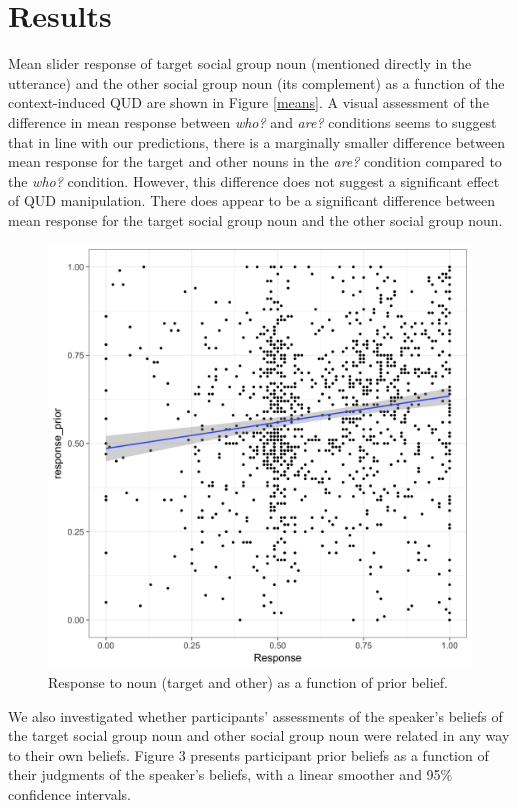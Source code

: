 \documentclass[11pt,a4paper]{article}
\begin{document}
\section{Results}

Mean slider response of target social group noun (mentioned directly in the utterance) and the other social group noun (its complement) as a function of the context-induced QUD are shown in Figure \ref{means}. A visual assessment of the difference in mean response between \textit{who?} and \textit{are?} conditions seems to suggest that in line with our predictions, there is a marginally smaller difference between mean response for the target and other nouns in the \textit{are?} condition compared to the \textit{who?} condition. However, this difference does not suggest a significant effect of QUD manipulation. There does appear to be a significant difference between mean response for the target social group noun and the other social group noun.

\begin{figure}[h]
\includegraphics[width=\linewidth]{priors_responses.png}
\caption{Response to noun (target and other) as a function of prior belief.}
\label{priors}
\end{figure}

We also investigated whether participants' assessments of the speaker's beliefs of the target social group noun and other social group noun were related in any way to their own beliefs. Figure 3 presents participant prior beliefs as a function of their judgments of the speaker's beliefs, with a linear smoother and 95\% confidence intervals. 
\end{document}

